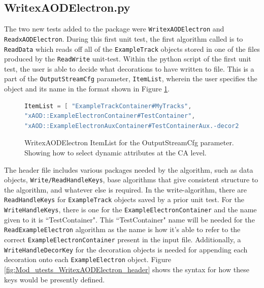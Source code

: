 \subsection{WritexAODElectron.py}
The two new tests added to the package were \verb|WritexAODElectron| and \verb|ReadxAODElectron|.
During this first unit test, the first algorithm called is to \verb|ReadData| which reads off all of the \verb|ExampleTrack| objects stored in one of the files produced by the \verb|ReadWrite| unit-test.
Within the python script of the first unit test, the user is able to decide what decorations to have written to file. 
This is a part of the \verb|OutputStreamCfg| parameter, \verb|ItemList|, wherein the user specifies the object and its name in the format shown in Figure \ref{fig:Mod_utests_WritexAODElectron_ItemList}. 
\begin{figure}[h]
\centering
\begin{lstlisting}[language=C]
ItemList = [ "ExampleTrackContainer#MyTracks", 
"xAOD::ExampleElectronContainer#TestContainer",
"xAOD::ExampleElectronAuxContainer#TestContainerAux.-decor2"] )
\end{lstlisting}
\caption{WritexAODElectron ItemList for the OutputStreamCfg parameter. Showing how to select dynamic attributes at the CA level.}
\label{fig:Mod_utests_WritexAODElectron_ItemList}
\end{figure}



The header file includes various packages needed by the algorithm, such as data objects, \verb|Write/ReadHandleKeys|, base algorithms that give consistent structure to the algorithm, and whatever else is required. 
In the write-algorithm, there are \verb|ReadHandleKeys| for \verb|ExampleTrack| objects saved by a prior unit test. 
For the \verb|WriteHandleKeys|, there is one for the \verb|ExampleElectronContainer| and the name given to it is ``TestContainer". 
This ``TestContainer" name will be needed for the \verb|ReadExampleElectron| algorithm as the name is how it's able to refer to the correct \verb|ExampleElectronContainer| present in the input file. 
Additionally, a \verb|WriteHandleDecorKey| for the decoration objects is needed for appending each decoration onto each \verb|ExampleElectron| object. 
Figure \ref{fig:Mod_utests_WritexAODElectron_header} shows the syntax for how these keys would be presently defined.

